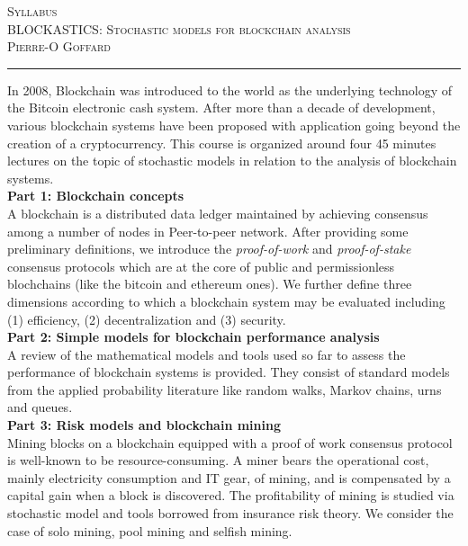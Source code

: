 \documentclass[11pt]{article}
\def\title{Syllabus}
\def\course{BLOCKASTICS: Stochastic models for blockchain analysis }
\def\profName{Pierre-O Goffard }
\begin{document}
{\center \textsc{\Large \title\\
	\large\course\\
	 \profName %
	}\\
	\vspace*{2em}
	\hrule
\vspace*{2em}}

In 2008, Blockchain was introduced to the world as the underlying technology of the Bitcoin electronic cash system. After more than a decade of development, various blockchain systems have been proposed with application going beyond the creation of a cryptocurrency. This course is organized around four 45 minutes lectures on the topic of stochastic models in relation to the analysis of blockchain systems. 
\\

\noindent \textbf{Part 1: Blockchain concepts}\\
\noindent A blockchain is a distributed data ledger maintained by achieving consensus among a number of nodes in Peer-to-peer network. After providing some preliminary definitions, 
we introduce the \textit{proof-of-work} and \textit{proof-of-stake} consensus protocols which are at the core of public and permissionless blochchains (like the bitcoin and ethereum ones). We further define three dimensions according to which a blockchain system may be evaluated including (1) efficiency, (2) decentralization and (3) security.    
\\

\noindent \textbf{Part 2: Simple models for blockchain performance analysis}\\
\noindent A review of the mathematical models and tools used so far to assess the performance of blockchain systems is provided. They consist of standard models from the applied probability literature like random walks, Markov chains, urns and queues.
\\

\noindent \textbf{Part 3: Risk models and blockchain mining}\\
\noindent Mining blocks on a blockchain equipped with a proof of work consensus protocol is well-known to be resource-consuming. A miner bears the operational cost, mainly
electricity consumption and IT gear, of mining, and is compensated by a capital gain when a block is discovered. The profitability of mining is studied via stochastic model and tools borrowed from insurance risk theory. We consider the case of solo mining, pool mining and selfish mining.    
\\
\end{document}
